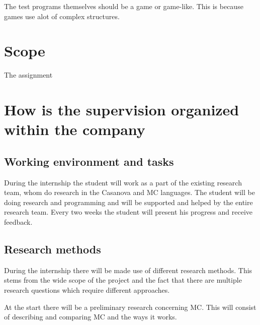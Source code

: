 The test programs themselves should be a game or game-like.
This is because games use alot of complex structures.




\section{Scope}
The assignment

\section{How is the supervision organized within the company}

\subsection{Working environment and tasks}\label{subsec:workenvmandate}
During the internship the student will work as a part of the existing research team, whom do research in the Casanova and MC languages.
The student will be doing research and programming and will be supported and helped by the entire research team.
Every two weeks the student will present his progress and receive feedback.

\subsection{Research methods}
During the internship there will be made use of different research methods.
This stems from the wide scope of the project and the fact that there are multiple research questions which require different approaches.

At the start there will be a preliminary research concerning MC.
This will consist of describing and comparing MC and the ways it works.

